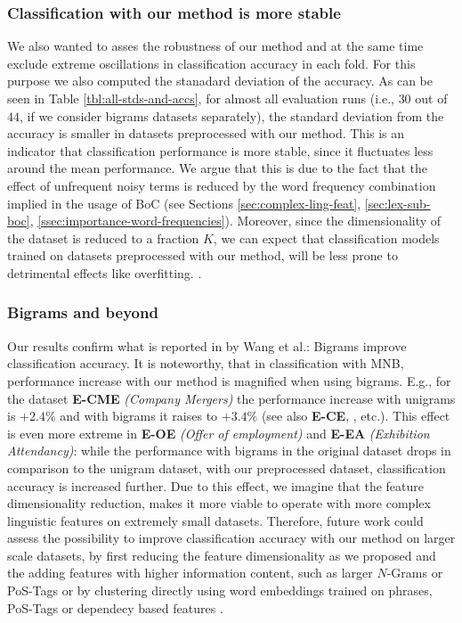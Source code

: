 \subsubsection{Classification with our method is more stable}
We also wanted to asses the robustness of our method and at the same time exclude extreme oscillations in classification accuracy in each fold. 
For this purpose we also computed the stanadard deviation of the accuracy. As can be seen in Table \ref{tbl:all-stds-and-accs}, for almost all evaluation runs 
(i.e., $30$ out of $44$, if we consider bigrams datasets separately), the standard deviation from the accuracy is smaller in datasets preprocessed with our method. 
This is an indicator that classification performance is more stable, since it fluctuates less around the mean performance. We argue that this is due to the fact that the 
effect of unfrequent noisy terms is reduced by the word frequency combination implied in the usage of BoC (see Sections \ref{sec:complex-ling-feat}, \ref{sec:lex-sub-boc}, \ref{ssec:importance-word-frequencies}). 
Moreover, since the dimensionality of the dataset is reduced to a fraction $K$, we can expect that classification models trained on datasets preprocessed with our method, will be less prone 
to detrimental effects like overfitting. \cite{sebastiani2002machine}. 
 
\subsubsection{Bigrams and beyond}
Our results confirm what is reported in \cite{wang2012baselines} by Wang et al.: Bigrams improve classification accuracy. 
It is noteworthy, that in classification with MNB, performance increase with our method is magnified when using bigrams. E.g., for the dataset \textbf{E-CME} 
\emph{(Company Mergers)} the performance increase with unigrams is $+2.4\%$ and with bigrams it raises to $+3.4\%$ (see also \textbf{E-CE}, , etc.).
This effect is even more extreme in \textbf{E-OE} \emph{(Offer of employment)} and \textbf{E-EA} \emph{(Exhibition Attendancy)}: while the performance with 
bigrams in the original dataset drops in comparison to the unigram dataset, with our preprocessed dataset, classification accuracy is increased further. 
Due to this effect, we imagine that the feature dimensionality reduction, makes it more viable to operate with more complex linguistic features 
on extremely small datasets. Therefore, future work could assess the possibility to improve classification accuracy with our method on larger scale datasets, by
first reducing the feature dimensionality as we proposed and the adding features with higher information content, such as larger $N$-Grams or PoS-Tags or by clustering directly 
using word embeddings trained on phrases, PoS-Tags or dependecy based features \cite{komninos2016dependency, liu2015learning}.   

